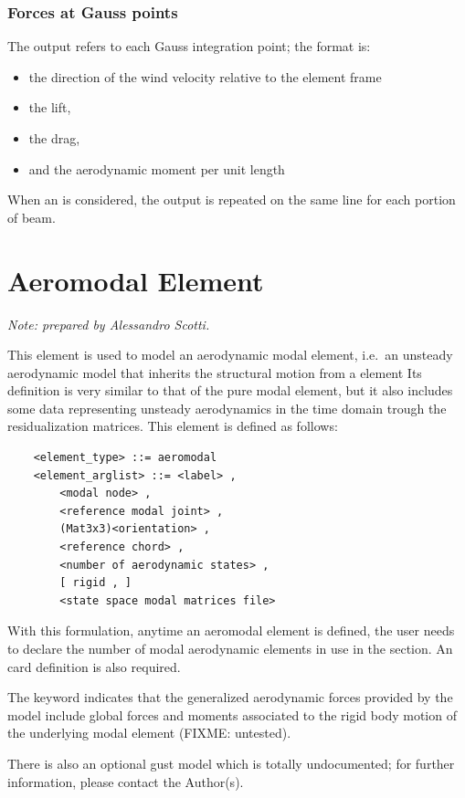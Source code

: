 \subsubsection{Forces at Gauss points}
The output refers to each Gauss integration point; the format is:
\begin{itemize}
    \item the direction of the wind velocity relative to the element frame
    \item the lift,
    \item the drag,
    \item and the aerodynamic moment per unit length
\end{itemize}
When an  is considered, the output 
is repeated on the same line for each portion of beam.



\section{Aeromodal Element}
\emph{Note: prepared by Alessandro Scotti.}

\noindent
This element is used to model an aerodynamic modal element,
i.e.\ an unsteady aerodynamic model that inherits the structural 
motion from a   element
Its definition is very similar to that of the pure modal element, 
but it also includes some data representing unsteady aerodynamics 
in the time domain trough the residualization matrices.
This element is defined as follows:
\begin{verbatim}
    <element_type> ::= aeromodal
    <element_arglist> ::= <label> , 
        <modal node> ,  
        <reference modal joint> ,
        (Mat3x3)<orientation> ,
        <reference chord> ,
        <number of aerodynamic states> ,
        [ rigid , ]
        <state space modal matrices file>
\end{verbatim}
With this formulation, anytime an aeromodal element is defined, 
the user needs to declare the number of modal aerodynamic elements 
in use in the  section.
An 
card definition is also required.

The keyword  indicates that the generalized aerodynamic forces
provided by the model include global forces and moments associated 
to the rigid body motion of the underlying modal element (FIXME: untested).

There is also an optional gust model which is totally undocumented;
for further information, please contact the Author(s).

